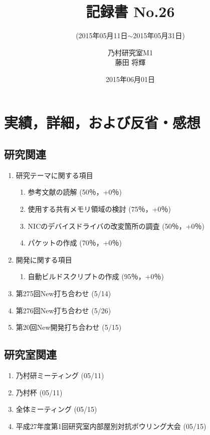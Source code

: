 \documentclass[fleqn, 14pt]{extarticlej}
\subtitle{(2015年05月11日$\sim$2015年05月31日)}
\author{乃村研究室M1\\藤田 将輝}
\date{2015年06月01日}
\title{記録書 No.26}
\begin{document}
\maketitle
\section{実績，詳細，および反省・感想}
\subsection{研究関連}
\label{sec-2-1}
\begin{enumerate}
    \item 研究テーマに関する項目
    \hfill
    \label{enum-research1}
    \begin{enumerate}
        \item 参考文献の読解
        \hfill
        \label{enum-1-A}
        (50％，+0％)
        \item 使用する共有メモリ領域の検討
        \hfill
        \label{enum-1-B}
        (75％，+0％)
        \item NICのデバイスドライバの改変箇所の調査
        \hfill
        \label{enum-1-C}
        (50％，+0％)
        \item パケットの作成
        \hfill
        \label{enum-1-D}
        (70％，+0％)\\
  
    \end{enumerate}
    \item 開発に関する項目
    \hfill
    \label{enum-research2}
    \begin{enumerate}

        \item 自動ビルドスクリプトの作成
        \hfill
        \label{enum-2-A}
        (95％，+0％)
    \end{enumerate}
    \item 第275回New打ち合わせ 
    \hfill
    \label{enum-research3}
    (5/14)
    \item 第276回New打ち合わせ 
    \hfill
    \label{enum-research3}
    (5/26)
    \item 第20回New開発打ち合わせ 
    \hfill
    \label{enum-research3}
    (5/15)

\end{enumerate}
  \subsection{研究室関連}
  \begin{enumerate}
   \item 乃村研ミーティング
         \hfill
         (05/11)
   \item 乃村杯
         \hfill
         (05/11)
   \item 全体ミーティング
         \hfill
         (05/15)
   \item 平成27年度第1回研究室内部屋別対抗ボウリング大会
         \hfill
         (05/15)
  \end{enumerate}
\end{document}
